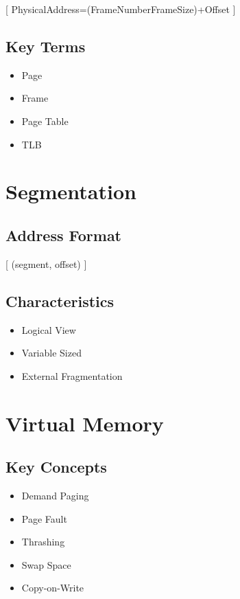 [
PhysicalAddress=(FrameNumber\times FrameSize)+Offset
]

\subsection*{Key Terms}

\begin{itemize}
\item Page
\item Frame
\item Page Table
\item TLB
\end{itemize}

\section{Segmentation}

\subsection*{Address Format}

[
(segment, offset)
]

\subsection*{Characteristics}

\begin{itemize}
\item Logical View
\item Variable Sized
\item External Fragmentation
\end{itemize}

\section{Virtual Memory}

\subsection*{Key Concepts}

\begin{itemize}
\item Demand Paging
\item Page Fault
\item Thrashing
\item Swap Space
\item Copy-on-Write
\end{itemize}

